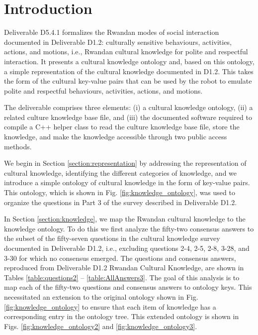 \documentclass{CSSRforAfrica}
\begin{document}
\pagebreak
\tableofcontents
\newpage


\section{Introduction}
 \label{section:introduction}

 
Deliverable D5.4.1  formalizes the Rwandan modes of social interaction documented in Deliverable D1.2:  culturally sensitive behaviours, activities, actions, and motions, i.e., Rwandan cultural knowledge for polite and respectful interaction. It presents  a cultural knowledge ontology and, based on this ontology, a simple representation of the cultural knowledge documented in D1.2. This takes the form of the cultural key-value pairs that can be used by the robot to emulate  polite and respectful behaviours, activities, actions, and motions.

The deliverable comprises three elements: (i) a cultural knowledge ontology, (ii) a related culture knowledge base file, and (iii)  the documented software required to compile a C++ helper class to read the culture knowledge base file, store the knowledge, and make the knowledge accessible through two public access methods. 

We begin in Section \ref{section:representation} by addressing the representation of cultural knowledge, identifying the different categories of knowledge, and we introduce a simple ontology of cultural knowledge in the form of key-value pairs. This ontology, which is shown in Fig. \ref{fig:knowledge_ontology},  was used to organize the questions in Part 3 of the survey described in Deliverable D1.2.

In Section \ref{section:knowledge}, we map the Rwandan cultural knowledge to the knowledge ontology.  To do this we first  analyze the fifty-two consensus answers to the subset of the fifty-seven questions in the cultural knowledge survey documented in Deliverable D1.2, i.e., excluding  questions 2-4, 2-5,  2-8,   3-28, and 3-30 for which no consensus emerged. 
The questions and consensus answers, reproduced from Deliverable D1.2 Rwandan Cultural Knowledge, are shown in Tables \ref{table:questions2} -- \ref{table:AllAnswers3}.  
The goal of this analysis is to map each of the fifty-two questions  and consensus answers to  ontology keys.  This necessitated an extension to the original ontology shown in Fig. \ref{fig:knowledge_ontology} to ensure that each item of knowledge has a corresponding entry in the ontology tree. This extended ontology is shown in Figs. \ref{fig:knowledge_ontology2} and \ref{fig:knowledge_ontology3}.
\end{document}
